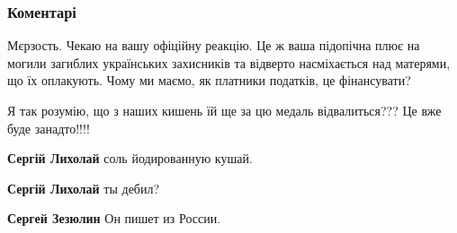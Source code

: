  
 
 
 
 
\subsubsection{Коментарі}
\label{sec:07_08_2021.fb.olympic_ua.1.maguchih.cmt}


\begin{itemize}


Мєрзость. Чекаю на вашу офіційну реакцію. Це ж ваша підопічна плює на могили
загиблих українських захисників та відверто насміхається над матерями, що їх
оплакують. Чому ми маємо, як платники податків, це фінансувати?

Я так розумію, що з наших кишень їй ще за цю медаль відвалиться??? Це вже буде
занадто!!!!

\begin{itemize}
 
\textbf{Сергій Лихолай} соль йодированную кушай.

 
\textbf{Сергій Лихолай} ты дебил?

\begin{itemize}

 
\textbf{Сергей Зезюлин} Он пишет из России.


\end{itemize}
\end{itemize}
\end{itemize}
